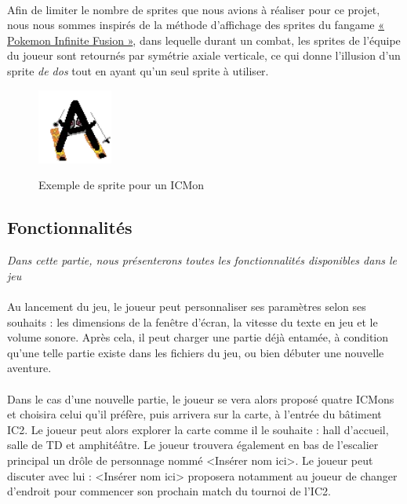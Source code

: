 \documentclass[12pt,a4paper, twoside]{article}
\begin{document}
        \paragraph{} Afin de limiter le nombre de sprites que nous avions à réaliser pour ce projet, nous nous sommes inspirés de la méthode d'affichage des sprites du fangame \href{https://infinitefusion.fandom.com/wiki/Pok%C3%A9mon_Infinite_Fusion_Wiki}{« Pokemon Infinite Fusion »}, dans lequelle durant un combat, les sprites de l'équipe du joueur sont retournés par symétrie axiale verticale, ce qui donne l'illusion d'un sprite \emph{de dos} tout en ayant qu'un seul sprite à utiliser.
        \begin{figure}[h!]
            \centering
            \includegraphics[width=0.22\textwidth]{../assets/Monsters/New Versions/A-ski.png}
            \label{fig:ICMon}
            \caption{Exemple de sprite pour un ICMon}
        \end{figure} 

    \subsection{Fonctionnalités}
        \emph{Dans cette partie, nous présenterons toutes les fonctionnalités disponibles dans le jeu} \\
        \paragraph{} Au lancement du jeu, le joueur peut personnaliser ses paramètres selon ses souhaits : les dimensions de la fenêtre d'écran, la vitesse du texte en jeu et le volume sonore. Après cela, il peut charger une partie déjà entamée, à condition qu'une telle partie existe dans les fichiers du jeu, ou bien débuter une nouvelle aventure. \paragraph{}
        Dans le cas d'une nouvelle partie, le joueur se vera alors proposé quatre ICMons et choisira celui qu'il préfère, puis arrivera sur la carte, à l'entrée du bâtiment IC2. Le joueur peut alors explorer la carte comme il le souhaite : hall d'accueil, salle de TD et amphitéâtre. Le joueur trouvera également en bas de l'escalier principal un drôle de personnage nommé <Insérer nom ici>.
        Le joueur peut discuter avec lui : <Insérer nom ici> proposera notamment au joueur de changer d'endroit pour commencer son prochain match du tournoi de l'IC2.
\end{document}

